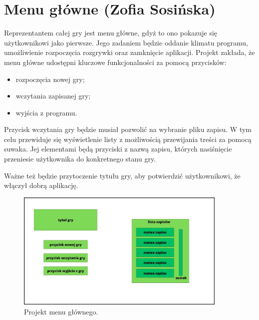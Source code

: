 \section{Menu główne (Zofia Sosińska)}\label{chap:menu_main}
Reprezentantem całej gry jest menu główne, gdyż to ono pokazuje się użytkownikowi jako pierwsze. Jego zadaniem będzie oddanie klimatu programu,
 umożliwienie rozpoczęcia rozgrywki oraz zamknięcie aplikacji.
Projekt zakłada, że menu główne udostępni kluczowe funkcjonalności za pomocą przycisków:
\begin{itemize}
    \item rozpoczęcia nowej gry;
    \item wczytania zapisanej gry;
    \item wyjścia z programu.
\end{itemize}

Przycisk wczytania gry będzie musiał pozwolić na wybranie pliku zapisu. W tym celu przewiduje się wyświetlenie listy
z możliwością przewijania treści za pomocą suwaka. Jej elementami będą przyciski z nazwą zapisu, których nasiśnięcie przeniesie 
użytkownika do konkretnego stanu gry.

Ważne też będzie przytoczenie tytułu gry, aby potwierdzić użytkownikowi, że włączył dobrą aplikację.
\begin{figure}[htbp]
    \centering
    \includegraphics[width=0.9\textwidth]{images/ui/ui_prooj_menu.jpg}
    \caption{Projekt menu głównego.
    }\label{fig:compass}
\end{figure}